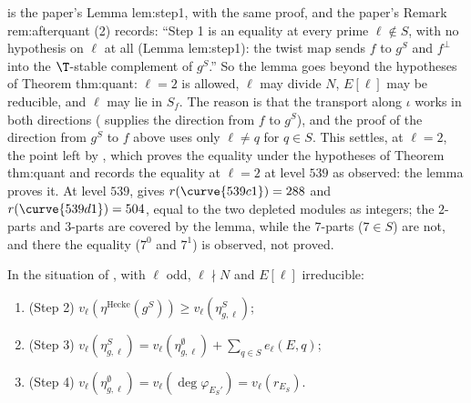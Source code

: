 \begin{remark}\label{rem:congruence:step1-commentary}
 is the paper's Lemma lem:step1, with the same proof, and the paper's Remark rem:afterquant (2) records: ``Step 1 is an equality at every prime $\ell\notin S$, with no
hypothesis on $\ell$ at all (Lemma lem:step1): the twist map sends $f$ to $g^S$ and $f^\perp$ into the $\T$-stable complement of $g^S$.'' So the lemma goes beyond the hypotheses of Theorem thm:quant:
$\ell=2$ is allowed, $\ell$ may divide $N$, $E[\ell]$ may be reducible, and $\ell$ may lie in $S_f$. The reason is that the transport along $\iota$ works in both
directions ( supplies the direction from $f$ to $g^S$), and the proof of the direction from $g^S$ to $f$ above uses only $\ell\ne q$ for $q\in S$. This settles, at $\ell=2$, the
point left by , which proves the equality under the hypotheses of Theorem thm:quant and records the equality at $\ell=2$ at level $539$ as observed: the lemma proves it. At level $539$,  gives $r(\curve{539c1})=288$ and $r(\curve{539d1})=504$, equal to the two depleted modules as integers; the $2$-parts and $3$-parts are
covered by the lemma, while the $7$-parts ($7\in S$) are not, and there the equality ($7^0$ and $7^1$) is observed, not proved.
\end{remark}

\begin{lemma}[Steps 2 to 4]\label{lem:congruence:quant-steps234}
In the situation of , with $\ell$ odd, $\ell\nmid N$ and $E[\ell]$ irreducible:
\begin{enumerate}[label=(\roman*)]
\item (Step 2) $v_\ell(\eta^{\mathrm{Hecke}}(g^S))\ge v_\ell(\eta^S_{g,\ell})$;
\item (Step 3) $v_\ell(\eta^S_{g,\ell})=v_\ell(\eta^\emptyset_{g,\ell})+\sum_{q\in S}e_\ell(E,q)$;
\item (Step 4) $v_\ell(\eta^\emptyset_{g,\ell})=v_\ell(\deg\varphi_{E_S'})=v_\ell(r_{E_S})$.
\end{enumerate}
\end{lemma}

